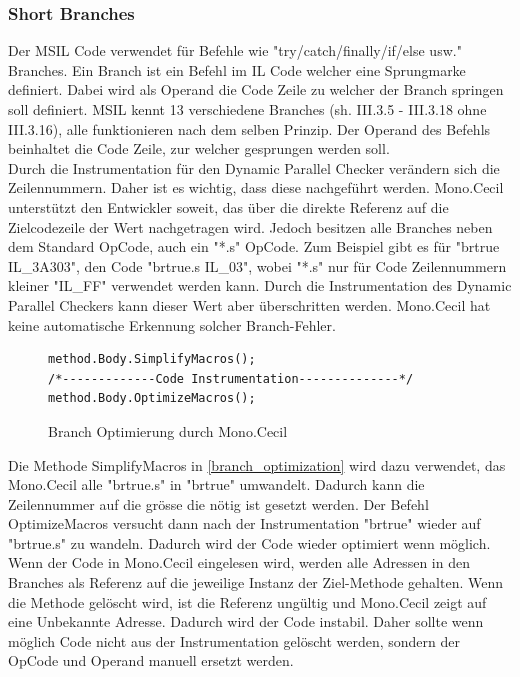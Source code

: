 \documentclass[10pt,a4paper]{article}
\begin{document}
\subsubsection{Short Branches}
\begin{flushleft}
Der MSIL Code verwendet für Befehle wie "try/catch/finally/if/else usw." Branches. Ein Branch ist ein Befehl im IL Code welcher eine Sprungmarke definiert. Dabei wird als Operand die Code Zeile zu welcher der Branch springen soll definiert. MSIL kennt 13 verschiedene Branches (sh. \cite{ecma} III.3.5 - III.3.18 ohne III.3.16), alle funktionieren nach dem selben Prinzip. Der Operand des Befehls beinhaltet die Code Zeile, zur welcher gesprungen werden soll.\\
Durch die Instrumentation für den Dynamic Parallel Checker verändern sich die Zeilennummern. Daher ist es wichtig, dass diese nachgeführt werden. Mono.Cecil unterstützt den Entwickler soweit, das über die direkte Referenz auf die Zielcodezeile der Wert nachgetragen wird. Jedoch besitzen alle Branches neben dem Standard OpCode, auch ein "*.s" OpCode. Zum Beispiel gibt es für "brtrue IL\_3A303", den Code "brtrue.s IL\_03", wobei "*.s" nur für Code Zeilennummern kleiner "IL\_FF" verwendet werden kann. Durch die Instrumentation des Dynamic Parallel Checkers kann dieser Wert aber überschritten werden. Mono.Cecil hat keine automatische Erkennung solcher Branch-Fehler.
\begin{figure}[H]
\centering
\begin{lstlisting}[backgroundcolor=\color{backcolor}]
method.Body.SimplifyMacros();
/*-------------Code Instrumentation--------------*/
method.Body.OptimizeMacros();
\end{lstlisting}
\caption{Branch Optimierung durch Mono.Cecil}\label{branch_optimization}
\end{figure}
Die Methode SimplifyMacros in \autoref{branch_optimization} wird dazu verwendet, das Mono.Cecil alle "brtrue.s" in "brtrue" umwandelt. Dadurch kann die Zeilennummer auf die grösse die nötig ist gesetzt werden. Der Befehl OptimizeMacros versucht dann nach der Instrumentation "brtrue" wieder auf "brtrue.s" zu wandeln. Dadurch wird der Code wieder optimiert wenn möglich.\\
Wenn der Code in Mono.Cecil eingelesen wird, werden alle Adressen in den Branches als Referenz auf die jeweilige Instanz der Ziel-Methode gehalten. Wenn die Methode gelöscht wird, ist die Referenz ungültig und Mono.Cecil zeigt auf eine Unbekannte Adresse. Dadurch wird der Code instabil. Daher sollte wenn möglich Code nicht aus der Instrumentation gelöscht werden, sondern der OpCode und Operand manuell ersetzt werden.
\end{flushleft}
\end{document}
